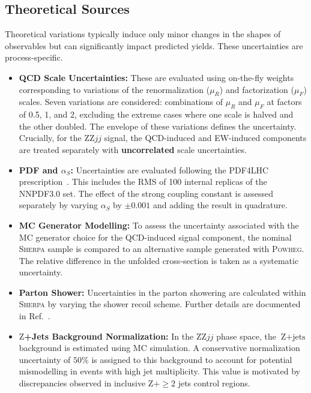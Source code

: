 \subsection{Theoretical Sources}
\label{subsec:theo_syst}

Theoretical variations typically induce only minor changes in the shapes of observables but can significantly impact predicted yields. These uncertainties are process-specific.

\begin{itemize}
    \item \textbf{QCD Scale Uncertainties:} 
    These are evaluated using on-the-fly weights corresponding to variations of the renormalization ($\mu_R$) and factorization ($\mu_F$) scales. Seven variations are considered: combinations of $\mu_R$ and $\mu_F$ at factors of 0.5, 1, and 2, excluding the extreme cases where one scale is halved and the other doubled. The envelope of these variations defines the uncertainty. Crucially, for the $\text{ZZ}jj$ signal, the QCD-induced and EW-induced components are treated separately with \textbf{uncorrelated} scale uncertainties.
        
    \item \textbf{PDF and $\alpha_S$:} 
    Uncertainties are evaluated following the PDF4LHC prescription~\cite{Butterworth:2015oua}. This includes the RMS of 100 internal replicas of the NNPDF3.0 set. The effect of the strong coupling constant is assessed separately by varying $\alpha_S$ by $\pm 0.001$ and adding the result in quadrature.

    \item \textbf{MC Generator Modelling:} 
    To assess the uncertainty associated with the MC generator choice for the QCD-induced signal component, the nominal \textsc{Sherpa} sample is compared to an alternative sample generated with \textsc{Powheg}. The relative difference in the unfolded cross-section is taken as a systematic uncertainty.
    
    \item \textbf{Parton Shower:}     
    Uncertainties in the parton showering are calculated within \textsc{Sherpa} by varying the shower recoil scheme. Further details are documented in Ref.~\cite{llvv_partonshower}.

    \item \textbf{$\text{Z}$+Jets Background Normalization:}
    In the $\text{ZZ}jj$ phase space, the $\text{Z}+\text{jets}$ background is estimated using MC simulation. A conservative normalization uncertainty of $50\%$ is assigned to this background to account for potential mismodelling in events with high jet multiplicity. This value is motivated by discrepancies observed in inclusive $\text{Z}+\ge 2$ jets control regions.
\end{itemize}


